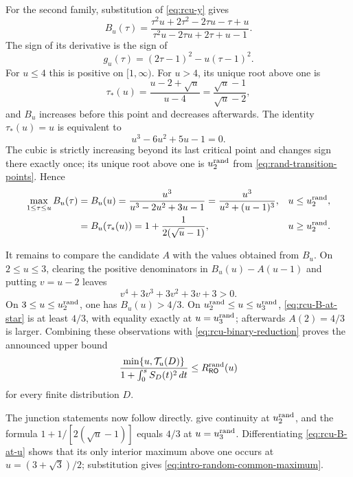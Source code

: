 For the second family, substitution of \eqref{eq:rcu-y} gives
\begin{equation}
 B_u(\tau)=
 \frac{\tau^2u+2\tau^2-2\tau u-\tau+u}
      {\tau^2u-2\tau u+2\tau+u-1}.
 \label{eq:rcu-B-rational}
\end{equation}
The sign of its derivative is the sign of
\begin{equation}
 g_u(\tau)=(2\tau-1)^2-u(\tau-1)^2.
 \label{eq:rcu-B-derivative}
\end{equation}
For $u\le4$ this is positive on $[1,\infty)$.  For $u>4$, its unique root
above one is
\begin{equation}
 \tau_*(u)=\frac{u-2+\sqrt u}{u-4}
           =\frac{\sqrt u-1}{\sqrt u-2},
 \label{eq:rcu-tau-star}
\end{equation}
and $B_u$ increases before this point and decreases afterwards.  The
identity $\tau_*(u)=u$ is equivalent to
\begin{equation}
 u^3-6u^2+5u-1=0.
 \label{eq:rcu-transition-cubic}
\end{equation}
The cubic is strictly increasing beyond its last critical point and changes
sign there exactly once; its unique root above one is $u_{2}^{\mathrm{rand}}$ from
\eqref{eq:rand-transition-points}.  Hence
\begin{align}
 \max_{1\le\tau\le u}B_u(\tau)
 &=B_u(u)=\frac{u^3}{u^3-2u^2+3u-1}
       =\frac{u^3}{u^2+(u-1)^3},&&u\le u_{2}^{\mathrm{rand}},
 \label{eq:rcu-B-at-u}\\
 &=B_u(\tau_*(u))
       =1+\frac1{2(\sqrt u-1)},&&u\ge u_{2}^{\mathrm{rand}}.
 \label{eq:rcu-B-at-star}
\end{align}

It remains to compare the candidate $A$ with the values obtained from $B_u$.
On $2\le u\le3$, clearing the positive
denominators in $B_u(u)-A(u-1)$ and putting $v=u-2$ leaves
\[
 v^4+3v^3+3v^2+3v+3>0.
\]
On $3\le u\le u_{2}^{\mathrm{rand}}$, one has $B_u(u)>4/3$.  On
$u_{2}^{\mathrm{rand}}\le u\le u_{3}^{\mathrm{rand}}$, \eqref{eq:rcu-B-at-star} is at least $4/3$,
with equality exactly at $u=u_{3}^{\mathrm{rand}}$; afterwards $A(2)=4/3$ is larger.  Combining
these observations with \eqref{eq:rcu-binary-reduction} proves the announced
upper bound
\begin{equation}
 \frac{\min\{u,\mathcal T_u(D)\}}
      {1+\int_0^sS_D(t)^2\,dt}
 \le R_{\mathsf{RO}}^{\mathrm{rand}}(u)
 \label{eq:rcu-announced-upper}
\end{equation}
for every finite distribution $D$.

The junction statements now follow directly.
 give
continuity at $u_{2}^{\mathrm{rand}}$, and the formula
$1+1/[2(\sqrt u-1)]$ equals $4/3$ at $u=u_{3}^{\mathrm{rand}}$.
Differentiating \eqref{eq:rcu-B-at-u} shows that its only
interior maximum above one occurs at $u=(3+\sqrt3)/2$; substitution gives
\eqref{eq:intro-random-common-maximum}.


